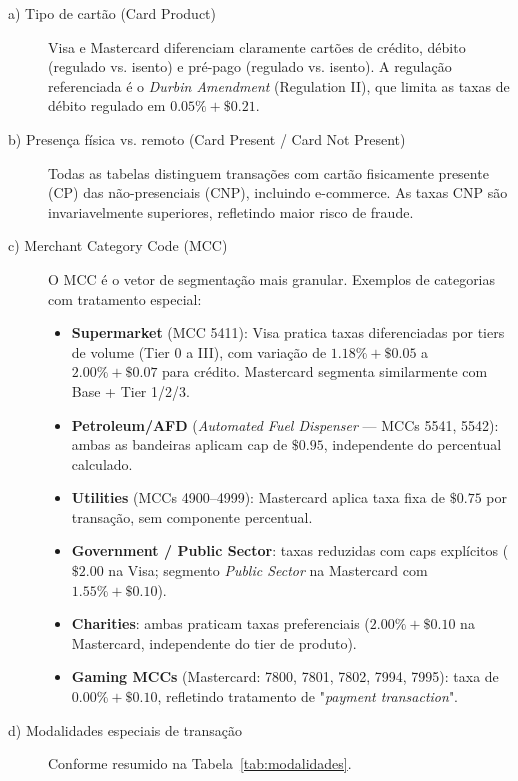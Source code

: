 \documentclass[12pt,a4paper]{article}
\begin{document}
\begin{description}
    \item[a) Tipo de cartão (Card Product)] Visa e Mastercard diferenciam claramente cartões de crédito, débito (regulado vs. isento) e pré-pago (regulado vs. isento). A regulação referenciada é o \textit{Durbin Amendment} (Regulation II), que limita as taxas de débito regulado em $0.05\% + \$0.21$.
    
    \item[b) Presença física vs. remoto (Card Present / Card Not Present)] Todas as tabelas distinguem transações com cartão fisicamente presente (CP) das não-presenciais (CNP), incluindo e-commerce. As taxas CNP são invariavelmente superiores, refletindo maior risco de fraude.
    
    \item[c) Merchant Category Code (MCC)] O MCC é o vetor de segmentação mais granular. Exemplos de categorias com tratamento especial:
    \begin{itemize}
        \item \textbf{Supermarket} (MCC 5411): Visa pratica taxas diferenciadas por tiers de volume (Tier 0 a III), com variação de $1.18\% + \$0.05$ a $2.00\% + \$0.07$ para crédito. Mastercard segmenta similarmente com Base + Tier 1/2/3.
        \item \textbf{Petroleum/AFD} (\textit{Automated Fuel Dispenser} --- MCCs 5541, 5542): ambas as bandeiras aplicam cap de $\$0.95$, independente do percentual calculado.
        \item \textbf{Utilities} (MCCs 4900–4999): Mastercard aplica taxa fixa de $\$0.75$ por transação, sem componente percentual.
        \item \textbf{Government / Public Sector}: taxas reduzidas com caps explícitos ($\$2.00$ na Visa; segmento \textit{Public Sector} na Mastercard com $1.55\% + \$0.10$).
        \item \textbf{Charities}: ambas praticam taxas preferenciais ($2.00\% + \$0.10$ na Mastercard, independente do tier de produto).
        \item \textbf{Gaming MCCs} (Mastercard: 7800, 7801, 7802, 7994, 7995): taxa de $0.00\% + \$0.10$, refletindo tratamento de "\textit{payment transaction}".
    \end{itemize}
    
    \item[d) Modalidades especiais de transação] Conforme resumido na Tabela~\ref{tab:modalidades}.
\end{description}
\end{document}
